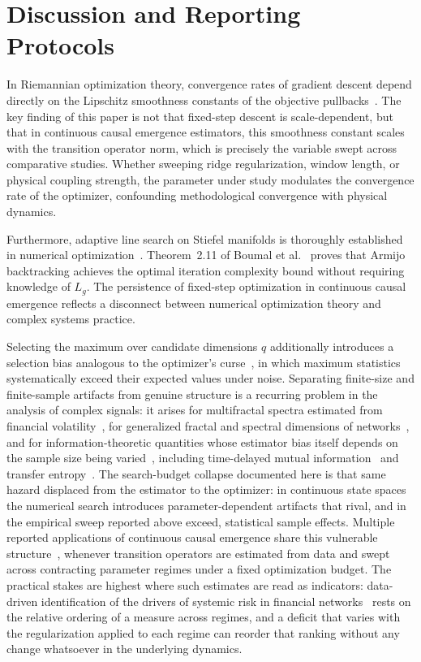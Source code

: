 \documentclass[preprint,12pt]{elsarticle}
\begin{document}
\section{Discussion and Reporting Protocols}

In Riemannian optimization theory, convergence rates of gradient descent depend directly on the Lipschitz smoothness constants of the objective pullbacks~\cite{Boumal2019}. The key finding of this paper is not that fixed-step descent is scale-dependent, but that in continuous causal emergence estimators, this smoothness constant scales with the transition operator norm, which is precisely the variable swept across comparative studies. Whether sweeping ridge regularization, window length, or physical coupling strength, the parameter under study modulates the convergence rate of the optimizer, confounding methodological convergence with physical dynamics.

Furthermore, adaptive line search on Stiefel manifolds is thoroughly established in numerical optimization~\cite{Boumal2019,Iannazzo2018,Oviedo2021,Francisco2012,WenYin2013}. Theorem~2.11 of Boumal et al.~\cite{Boumal2019} proves that Armijo backtracking achieves the optimal iteration complexity bound without requiring knowledge of $L_g$. The persistence of fixed-step optimization in continuous causal emergence reflects a disconnect between numerical optimization theory and complex systems practice.

Selecting the maximum over candidate dimensions $q$ additionally introduces a selection bias analogous to the optimizer's curse~\cite{SmithWinkler2006}, in which maximum statistics systematically exceed their expected values under noise. Separating finite-size and finite-sample artifacts from genuine structure is a recurring problem in the analysis of complex signals: it arises for multifractal spectra estimated from financial volatility~\cite{Zhou2012}, for generalized fractal and spectral dimensions of networks~\cite{Craig2022}, and for information-theoretic quantities whose estimator bias itself depends on the sample size being varied~\cite{Wolpert1995,Holmes2019}, including time-delayed mutual information~\cite{Albers2012} and transfer entropy~\cite{Qiu2025}. The search-budget collapse documented here is that same hazard displaced from the estimator to the optimizer: in continuous state spaces the numerical search introduces parameter-dependent artifacts that rival, and in the empirical sweep reported above exceed, statistical sample effects. Multiple reported applications of continuous causal emergence share this vulnerable structure~\cite{HoelLevin2020,Tolle2026,ZhangLiu2023,HouDai2026}, whenever transition operators are estimated from data and swept across contracting parameter regimes under a fixed optimization budget. The practical stakes are highest where such estimates are read as indicators: data-driven identification of the drivers of systemic risk in financial networks~\cite{Alexandre2021} rests on the relative ordering of a measure across regimes, and a deficit that varies with the regularization applied to each regime can reorder that ranking without any change whatsoever in the underlying dynamics.
\end{document}
